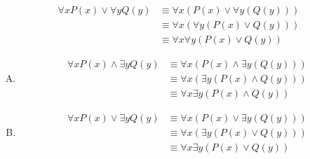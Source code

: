 {{        %
        \begin{practices}
            \begin{align*}
                \forall x P(x) \vee \forall y Q(y)
                &\equiv \forall x (P(x) \vee \forall y (Q(y))) \\
                &\equiv \forall x (\forall y (P(x) \vee Q(y))) \\
                &\equiv \forall x \forall y (P(x) \vee Q(y))
            \end{align*}
        \end{practices}

        \begin{practices}
            \begin{enumerate}[A.]
                \item
                {
                    \begin{align*}
                        \forall x P(x) \wedge \exists y Q(y)
                        &\equiv \forall x (P(x) \wedge \exists y (Q(y))) \\
                        &\equiv \forall x (\exists y (P(x) \wedge Q(y))) \\
                        &\equiv \forall x \exists y (P(x) \wedge Q(y))
                    \end{align*}
                }
                \item
                {
                    \begin{align*}
                        \forall x P(x) \vee \exists y Q(y)
                        &\equiv \forall x (P(x) \vee \exists y (Q(y))) \\
                        &\equiv \forall x (\exists y (P(x) \vee Q(y))) \\
                        &\equiv \forall x \exists y (P(x) \vee Q(y))
                    \end{align*}
                }
            \end{enumerate}
        \end{practices}

}}
